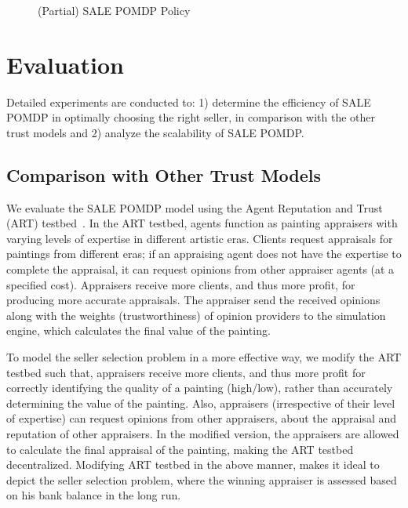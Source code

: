 \documentclass{aamas2014}
\providecommand{\SALEP}{SALE POMDP}
\begin{document}
\begin{figure}[h!]
\caption{(Partial) \SALEP{} Policy} \label{fig:beleif}
\vspace{-5mm}
\end{figure}



\section{Evaluation}\label{sec:5}
Detailed experiments are conducted to: 1) determine the efficiency of \SALEP{} in optimally choosing the right seller, in comparison with the other trust models and 2) analyze the scalability of \SALEP{}.

\subsection{Comparison with Other Trust Models}
  We evaluate the \SALEP{} model using the Agent Reputation and Trust (ART) testbed~\cite{fullam2005specification}. In the ART testbed, agents function as painting appraisers with varying levels of expertise in different artistic eras. Clients request appraisals for paintings from different eras; if an appraising agent does not have the expertise to complete the appraisal, it can request opinions from other appraiser agents (at a specified cost). Appraisers receive more clients, and thus more profit, for producing more accurate appraisals. The appraiser send the received opinions along with the weights (trustworthiness) of opinion providers to the simulation engine, which calculates the final value of the painting.

  To model the seller selection problem in a more effective way, we modify the ART testbed such that, appraisers receive more clients, and thus more profit for correctly identifying the quality of a painting (high/low), rather than accurately determining the value of the painting. Also, appraisers (irrespective of their level of expertise) can request opinions from other appraisers, about the appraisal and reputation of other appraisers. In the modified version, the appraisers are allowed to calculate the final appraisal of the painting, making the ART testbed decentralized. Modifying ART testbed in the above manner, makes it ideal to depict the seller selection problem, where the winning appraiser is assessed based on his bank balance in the long run.
\end{document}
